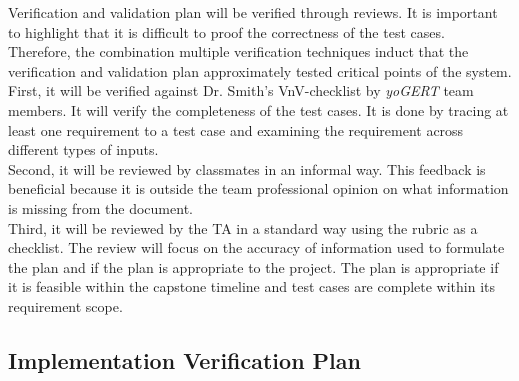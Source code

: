 \documentclass[12pt, titlepage]{article}
\begin{document}
Verification and validation plan will be verified through reviews. It is important to highlight that it is difficult to proof the correctness of the test cases. Therefore, the combination multiple verification techniques induct that the verification and validation plan  approximately tested critical points of the system.\\ 
First, it will be verified against Dr. Smith's VnV-checklist by \emph{yoGERT} team members. It will verify the completeness of the test cases. It is done by tracing at least one requirement to a test case and examining the requirement across different types of inputs.\\ 
Second, it will be reviewed by classmates in an informal way. This feedback is beneficial because it is outside the team professional opinion on what information is missing from the document.\\ 
Third, it will be reviewed by the TA in a standard way using the rubric as a checklist. The review will focus on the accuracy of information used to formulate the plan and if the plan is appropriate to the project. The plan is appropriate if it is feasible within the capstone timeline and test cases are complete within its requirement scope. 




\subsection{Implementation Verification Plan}
\end{document}
